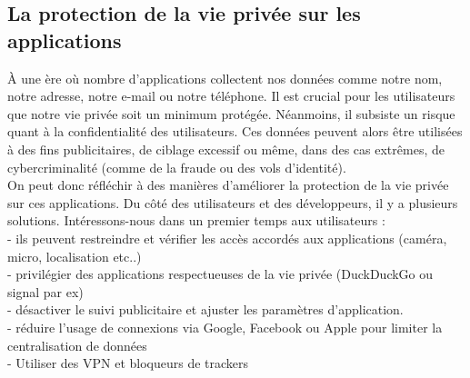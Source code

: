 \documentclass{article}
\begin{document}
\subsection{La protection de la vie privée sur les applications}
À une ère où nombre d'applications collectent nos données  comme notre nom, notre adresse, notre e-mail ou notre téléphone. Il est crucial pour les utilisateurs que notre vie privée soit un minimum protégée. Néanmoins, il subsiste un risque quant à la confidentialité des utilisateurs. Ces données peuvent alors être utilisées à des fins publicitaires, de ciblage excessif ou même, dans des cas extrêmes, de cybercriminalité (comme de la fraude ou des vols d'identité).\\
On peut donc réfléchir à des manières d'améliorer la protection de la vie privée sur ces applications. Du côté des utilisateurs et des développeurs, il y a plusieurs solutions. Intéressons-nous dans un premier temps aux utilisateurs :\\
- ils peuvent restreindre et vérifier les accès accordés aux applications (caméra, micro, localisation etc..)\\
- privilégier des applications respectueuses de la vie privée (DuckDuckGo ou signal par ex)\\
- désactiver le suivi publicitaire et ajuster les paramètres d'application.\\
- réduire l'usage de connexions via Google, Facebook ou Apple pour limiter la centralisation de données \\
- Utiliser des VPN et bloqueurs de trackers\\
\end{document}
